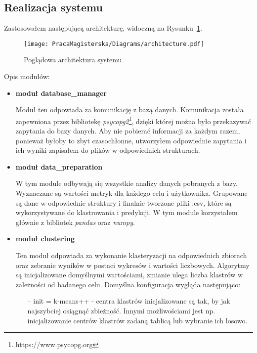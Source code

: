 \documentclass[polish,12pt]{aghthesis}
\begin{document}
\subsection{Realizacja systemu}


    
Zastosowałem następującą architekturę, widoczną na Rysunku~\ref{architecture}. 

     \begin{figure}[ht]
    \centering
    \texttt{[image: PracaMagisterska/Diagrams/architecture.pdf]}
    \caption{Poglądowa architektura systemu}
    \label{architecture}
\end{figure}

  
    
Opis modułów:
\begin{itemize}
    \item \textbf{moduł database\_manager}
    
    Moduł ten odpowiada za komunikację z bazą danych. Komunikacja została zapewniona przez bibliotekę \textit{psycopg2}\footnote{https://www.psycopg.org}, dzięki której można było przekazywać zapytania do bazy danych. Aby nie pobierać informacji za każdym razem, ponieważ byłoby to zbyt czasochłonne, utworzyłem odpowiednie zapytania i ich wyniki zapisałem do plików w odpowiednich strukturach.
    
    \item \textbf{moduł data\_preparation}
    
    W tym module odbywają się wszystkie analizy danych pobranych z bazy. Wyznaczane są wartości metryk dla każdego celu i użytkownika. Grupowane są dane w odpowiednie struktury i finalnie tworzone pliki .csv, które są wykorzystywane do klastrowania i predykcji. W tym module korzystałem głównie z bibliotek \textit{pandas} oraz \textit{numpy}. 
    
    \item \textbf{moduł clustering}
    
    Ten moduł odpowiada za wykonanie klasteryzacji na odpowiednich zbiorach oraz zebranie wyników w postaci wykresów i wartości liczbowych. Algorytmy są inicjalizowane domyślnymi wartościami, zmianie ulega liczba klastrów w zależności od badanego celu. Domyślna konfiguracja wygląda następująco:
    

    
    \begin{itemize}
    \setlength\itemsep{0,1em}
    \item[--] init = k-means++ - centra klastrów inicjalizowane są tak, by jak najszybciej osiągnąć zbieżność. Innymi możliwościami jest np. inicjalizowanie centrów klastrów zadaną tablicą lub wybranie ich losowo.
    

\end{itemize}
\end{itemize}
\end{document}
